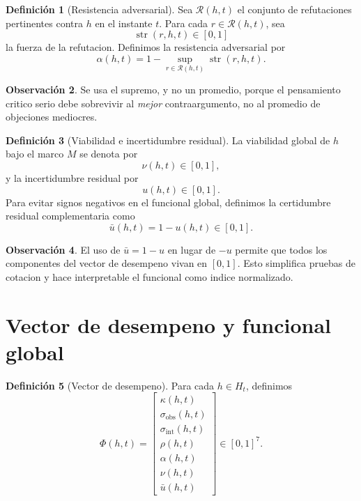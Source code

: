 \documentclass[12pt,a4paper]{article}
\newcommand{\str}{\operatorname{str}}
\theoremstyle{definition}
\newtheorem{definition}{Definici\'on}[section]
\newtheorem{remark}[definition]{Observaci\'on}
\theoremstyle{plain}
\theoremstyle{remark}
\begin{document}
\begin{definition}[Resistencia adversarial]
Sea $\mathcal{R}(h,t)$ el conjunto de refutaciones pertinentes contra $h$ en el instante $t$. Para cada $r\in\mathcal{R}(h,t)$, sea
\begin{equation}
\str(r,h,t)\in[0,1]
\end{equation}
la fuerza de la refutacion. Definimos la resistencia adversarial por
\begin{equation}
\alpha(h,t)=1-\sup_{r\in\mathcal{R}(h,t)}\str(r,h,t).
\end{equation}
\end{definition}

\begin{remark}
Se usa el supremo, y no un promedio, porque el pensamiento critico serio debe sobrevivir al \emph{mejor} contraargumento, no al promedio de objeciones mediocres.
\end{remark}

\begin{definition}[Viabilidad e incertidumbre residual]
La viabilidad global de $h$ bajo el marco $M$ se denota por
\begin{equation}
\nu(h,t)\in[0,1],
\end{equation}
y la incertidumbre residual por
\begin{equation}
 u(h,t)\in[0,1].
\end{equation}
Para evitar signos negativos en el funcional global, definimos la certidumbre residual complementaria como
\begin{equation}
\bar{u}(h,t)=1-u(h,t)\in[0,1].
\end{equation}
\end{definition}

\begin{remark}
El uso de $\bar{u}=1-u$ en lugar de $-u$ permite que todos los componentes del vector de desempeno vivan en $[0,1]$. Esto simplifica pruebas de cotacion y hace interpretable el funcional como indice normalizado.
\end{remark}

\section{Vector de desempeno y funcional global}

\begin{definition}[Vector de desempeno]
Para cada $h\in H_t$, definimos
\begin{equation}
\Phi(h,t)=
\begin{bmatrix}
\kappa(h,t)\\
\sigma_{\mathrm{obs}}(h,t)\\
\sigma_{\mathrm{int}}(h,t)\\
\rho(h,t)\\
\alpha(h,t)\\
\nu(h,t)\\
\bar{u}(h,t)
\end{bmatrix}
\in[0,1]^7.
\end{equation}
\end{definition}
\end{document}
